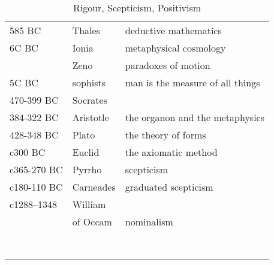 \begin{table}[h]
\begin{center}
\begin{tabular}{|l l p{5cm}|}
\hline
585 BC & Thales & deductive mathematics \\
6C BC & Ionia & metaphysical cosmology \\
 & Zeno & paradoxes of motion \\
5C BC & sophists & man is the measure of all things \\
470-399 BC & Socrates & \\
384-322 BC & Aristotle & the organon and the metaphysics \\
428-348 BC & Plato & the theory of forms \\

c300 BC & Euclid & the axiomatic method \\
c365-270 BC & Pyrrho & scepticism \\
c180-110 BC & Carneades & graduated scepticism \\
c1288–1348 & William & \\
& of Occam & nominalism \\
 &  & \\
 &  & \\
 &  & \\
 &  & \\
 &  & \\
 &  & \\
 &  & \\
 &  & \\
\hline
\end{tabular}
\caption{Rigour, Scepticism, Positivism}
\label{tab:RigourScepticismPositivism}
\end{center}
\end{table}
